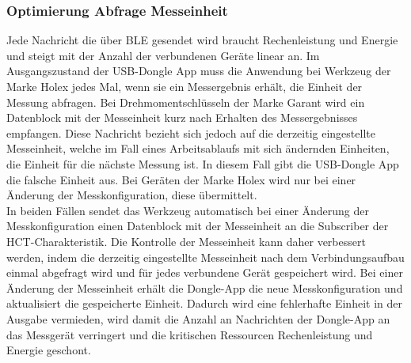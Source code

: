 \subsubsection{Optimierung Abfrage Messeinheit}
Jede Nachricht die über \ac{BLE} gesendet wird braucht Rechenleistung und Energie und steigt mit der Anzahl der verbundenen Geräte linear an. Im Ausgangszustand der \ac{USB}-Dongle App muss die Anwendung bei Werkzeug der Marke Holex jedes Mal, wenn sie ein Messergebnis erhält, die Einheit der Messung abfragen. Bei Drehmomentschlüsseln der Marke Garant wird ein Datenblock mit der Messeinheit kurz nach Erhalten des Messergebnisses empfangen. Diese Nachricht bezieht sich jedoch auf die derzeitig eingestellte Messeinheit, welche im Fall eines Arbeitsablaufs mit sich ändernden Einheiten, die Einheit für die nächste Messung ist. In diesem Fall gibt die \ac{USB}-Dongle App die falsche Einheit aus. Bei Geräten der Marke Holex wird nur bei einer Änderung der Messkonfiguration, diese übermittelt.\\
In beiden Fällen sendet das Werkzeug automatisch bei einer Änderung der Messkonfiguration einen Datenblock mit der Messeinheit an die Subscriber der \ac{HCT}-Charakteristik. Die Kontrolle der Messeinheit kann daher verbessert werden, indem die derzeitig eingestellte Messeinheit nach dem Verbindungsaufbau einmal abgefragt wird und für jedes verbundene Gerät gespeichert wird. Bei einer Änderung der Messeinheit erhält die Dongle-App die neue Messkonfiguration und aktualisiert die gespeicherte Einheit. Dadurch wird eine fehlerhafte Einheit in der Ausgabe vermieden, wird damit die Anzahl an Nachrichten der Dongle-App an das Messgerät verringert und die kritischen Ressourcen Rechenleistung und Energie geschont.

